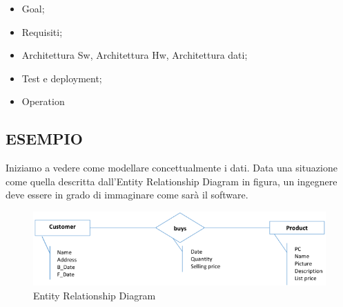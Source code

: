 \begin{itemize}

\item Goal;
\item Requisiti;
\item Architettura Sw, Architettura Hw, Architettura dati;
\item Test e deployment;
\item Operation

\end{itemize}


\subsection{ESEMPIO}

Iniziamo	a	vedere	come	modellare	concettualmente	i	dati.	Data	una	situazione	come	quella	descritta	dall’Entity	Relationship	Diagram	in	figura,	un	ingegnere	deve	essere	in	grado	di	immaginare	come	sarà	il	software.	

\begin{center}
\begin{figure}[H]
\centering
\includegraphics[scale=0.8]{figures/ERD.png}
\caption{Entity Relationship Diagram} 
\end{figure}
\end{center}

